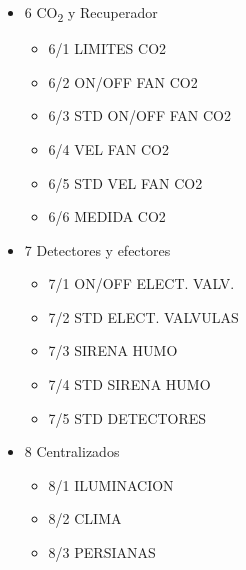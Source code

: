 \begin{multicols}{2} 
\begin{flushleft} 
\begin{itemize}
\item{6 CO\textsubscript{2} y Recuperador}
\begin{itemize}
\item{6/1 LIMITES CO2}
\item{6/2 ON/OFF FAN CO2}
\item{6/3 STD ON/OFF FAN CO2}
\item{6/4 VEL FAN CO2}
\item{6/5 STD VEL FAN CO2}
\item{6/6 MEDIDA CO2}
\end{itemize} 
\end{itemize} 
\end{flushleft}

\begin{flushright} 
\begin{itemize}
\item{7 Detectores y efectores}
\begin{itemize}
\item{7/1 ON/OFF ELECT. VALV.}
\item{7/2 STD ELECT. VALVULAS}
\item{7/3 SIRENA HUMO}
\item{7/4 STD SIRENA HUMO}
\item{7/5 STD DETECTORES}
\end{itemize} 
\end{itemize} 
\end{flushright} 
\end{multicols} 

\begin{flushleft} 
\begin{itemize}
\item{8 Centralizados}
\begin{itemize}
\item{8/1 ILUMINACION}
\item{8/2 CLIMA}
\item{8/3 PERSIANAS}
\end{itemize} 
\end{itemize} 
\end{flushleft}

